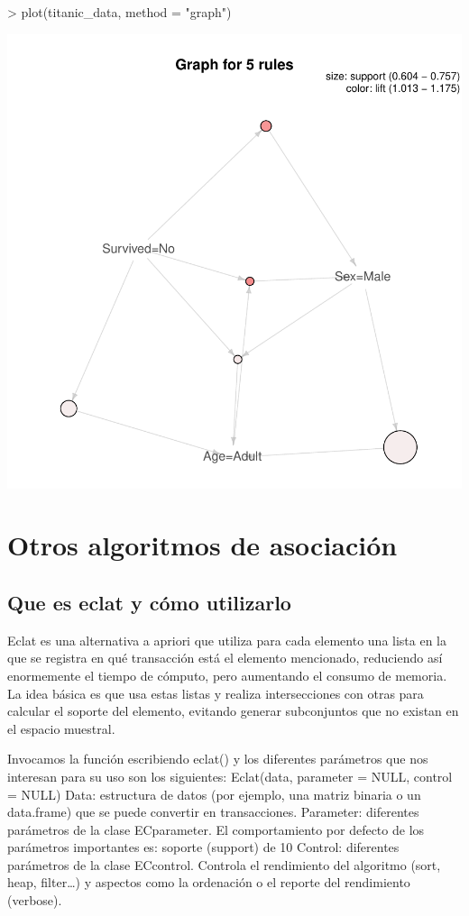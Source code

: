 \documentclass [a4paper] {article}
\begin{document}
\begin{center}
\begin{Schunk}
\begin{Sinput}
> plot(titanic_data, method = "graph")
\end{Sinput}
\end{Schunk}
\includegraphics{entrega-grafica_apriori_titanic_data_graph}
\end{center}

\section{Otros algoritmos de asociación}

\subsection{Que es eclat y cómo utilizarlo}
Eclat es una alternativa a apriori que utiliza para cada elemento una lista en la que se registra en qué transacción está el 
elemento mencionado, reduciendo así enormemente el tiempo de cómputo, pero aumentando el consumo de memoria. La idea básica 
es que usa estas listas y realiza intersecciones con otras para calcular el soporte del elemento, evitando generar subconjuntos 
que no existan en el espacio muestral.

Invocamos la función escribiendo eclat() y los diferentes parámetros que nos interesan para su uso son los siguientes:
Eclat(data, parameter = NULL,  control = NULL)
Data: estructura de datos (por ejemplo, una matriz binaria o un data.frame) que se puede convertir en transacciones.
Parameter: diferentes parámetros de la clase ECparameter. El comportamiento por defecto de los parámetros importantes es: soporte (support) de 10%
Control: diferentes parámetros de la clase ECcontrol. Controla el rendimiento del algoritmo (sort, heap, filter…) y aspectos como la ordenación o el reporte del rendimiento (verbose).
\end{document}
